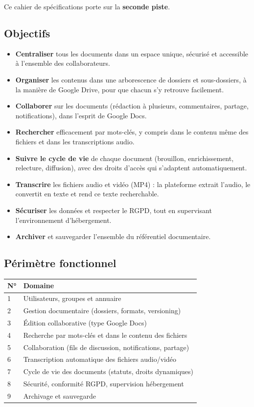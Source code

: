\documentclass[a4paper,12pt,french]{article}
\begin{document}
Ce cahier de spécifications porte sur la \textbf{seconde piste}.

\subsection{Objectifs}

\begin{itemize}[leftmargin=1.5em]
  \item \textbf{Centraliser} tous les documents dans un espace unique, sécurisé et accessible à l'ensemble des collaborateurs.
  \item \textbf{Organiser} les contenus dans une arborescence de dossiers et sous-dossiers, à la manière de Google Drive, pour que chacun s'y retrouve facilement.
  \item \textbf{Collaborer} sur les documents (rédaction à plusieurs, commentaires, partage, notifications), dans l'esprit de Google Docs.
  \item \textbf{Rechercher} efficacement par mots-clés, y compris dans le contenu même des fichiers et dans les transcriptions audio.
  \item \textbf{Suivre le cycle de vie} de chaque document (brouillon, enrichissement, relecture, diffusion), avec des droits d'accès qui s'adaptent automatiquement.
  \item \textbf{Transcrire} les fichiers audio et vidéo (MP4) : la plateforme extrait l'audio, le convertit en texte et rend ce texte recherchable.
  \item \textbf{Sécuriser} les données et respecter le RGPD, tout en supervisant l'environnement d'hébergement.
  \item \textbf{Archiver} et sauvegarder l'ensemble du référentiel documentaire.
\end{itemize}

\subsection{Périmètre fonctionnel}

\begin{tabularx}{\textwidth}{l X}
\toprule
\textbf{N°} & \textbf{Domaine} \\
\midrule
1 & Utilisateurs, groupes et annuaire \\
2 & Gestion documentaire (dossiers, formats, versioning) \\
3 & Édition collaborative (type Google Docs) \\
4 & Recherche par mots-clés et dans le contenu des fichiers \\
5 & Collaboration (fils de discussion, notifications, partage) \\
6 & Transcription automatique des fichiers audio/vidéo \\
7 & Cycle de vie des documents (statuts, droits dynamiques) \\
8 & Sécurité, conformité RGPD, supervision hébergement \\
9 & Archivage et sauvegarde \\
\bottomrule
\end{tabularx}
\end{document}
